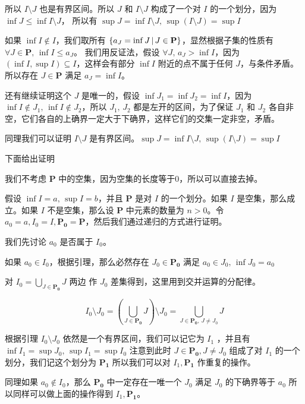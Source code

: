 \begin{enumerate}
    所以 $I \setminus J$ 也是有界区间。所以 $J$ 和 $I \setminus J$ 构成了一个对 $I$ 的一个划分，因为 $\inf J \le \inf I \setminus J$，
    所以有 $\sup J = \inf I \setminus J,\, \sup(I \setminus J) = \sup I$

    如果 $\inf I \notin I$，我们取所有 $\{ a_J = \inf J \,\vert\, J \in \mathbf{P} \}$，显然根据子集的性质有 $\forall J \in \mathbf{P},\, \inf I \le a_J$。
    我们用反证法，假设 $\forall J,\, a_J > \inf I$，因为 $(\inf I, \sup I) \subseteq I$，这样会有部分 $\inf I$ 附近的点不属于任何 $J$，与条件矛盾。
    所以存在 $J \in \mathbf{P}$ 满足 $a_J = \inf I$。

    还有继续证明这个 $J$ 是唯一的，假设 $\inf J_1 = \inf J_2 = \inf I$，因为 $\inf I \notin J_1,\, \inf I \notin J_2$，所以
    $J_1,\, J_2$ 都是左开的区间，为了保证 $J_1$ 和 $J_2$ 各自非空，它们各自的上确界一定大于下确界，这样它们的交集一定非空，矛盾。

    同理我们可以证明 $I \setminus J$ 是有界区间。$\sup J = \inf I \setminus J,\, \sup(I \setminus J) = \sup I$


\end{enumerate}

下面给出证明

我们不考虑 $\mathbf{P}$ 中的空集，因为空集的长度等于$0$，所以可以直接去掉。 

假设 $\inf I = a,\, \sup I = b $，并且 $\mathbf{P}$ 是对 $I$ 的一个划分。如果 $I$ 是空集，那么成立。如果 $I$ 不是空集，那么设 $\mathbf{P}$ 中元素的数量为 $n > 0$。令 $a_0=a, I_0 = I, \mathbf{P_0} = \mathbf{P}$，然后我们通过递归的方式进行证明。

我们先讨论 $ a_0$ 是否属于 $I_0$。

如果 $a_0 \in I_0$，根据引理，那么必然存在 $J_0 \in \mathbf{P_0}$ 满足 $a_0 \in J_0,\, \inf J_0 = a_0$

对 $I_0 = \bigcup_{J \in \mathbf{P_0}} J $ 两边  作 $J_0$ 差集得到，这里用到交并运算的分配律。

\[
I_0 \setminus J_0 = (\bigcup_{J \in \mathbf{P_0}}J) \setminus J_0 = \bigcup_{J \in \mathbf{P_0},\, J \ne J_0}J
\]

根据引理 $I_0 \setminus J_0$ 依然是一个有界区间，我们可以记它为 $I_1$ ，并且有 $\inf I_1 = \sup J_0,\, \sup I_1 = \sup I_0$ 注意到此时 $J \in \mathbf{P_0}, J \ne J_0$ 组成了对 $I_1$ 的一个划分，我们记这个划分为 $\mathbf{P_1}$ 所以我们可以对 $I_1, \mathbf{P_1}$ 作重复的操作。

同理如果 $a_0 \notin I_0$，那么 $\mathbf{P_0}$ 中一定存在一唯一个 $J_0$ 满足 $J_0$ 的下确界等于 $a_0$
所以同样可以做上面的操作得到 $I_1, \mathbf{P_1}$。

